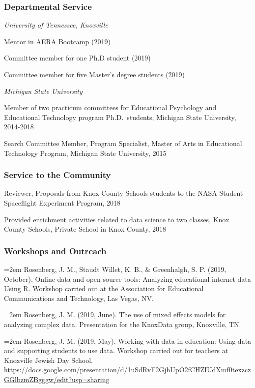 \documentclass[14,]{article}
\begin{document}
\hypertarget{departmental-service}{%
\subsubsection{Departmental Service}\label{departmental-service}}

\emph{University of Tennessee, Knoxville}

Mentor in AERA Bootcamp (2019)

Committee member for one Ph.D student (2019)

Committee member for five Master's degree students (2019)

\emph{Michigan State University}

Member of two practicum committees for Educational Psychology and
Educational Technology program Ph.D.~students, Michigan State
University, 2014-2018

Search Committee Member, Program Specialist, Master of Arts in
Educational Technology Program, Michigan State University, 2015

\hypertarget{service-to-the-community-1}{%
\subsubsection{Service to the
Community}\label{service-to-the-community-1}}

Reviewer, Proposals from Knox County Schools students to the NASA
Student Spaceflight Experiment Program, 2018

Provided enrichment activities related to data science to two classes,
Knox County Schools, Private School in Knox County, 2018

\hypertarget{workshops-and-outreach}{%
\subsubsection{Workshops and Outreach}\label{workshops-and-outreach}}

\hangindent=2em Rosenberg, J. M., Staudt Willet, K. B., \& Greenhalgh,
S. P. (2019, October). Online data and open source tools: Analyzing
educational internet data Using R. Workshop carried out at the
Association for Educational Communications and Technology, Las Vegas,
NV.

\hangindent=2em Rosenberg, J. M. (2019, June). The use of mixed effects
models for analyzing complex data. Presentation for the KnoxData group,
Knoxville, TN.

\hangindent=2em Rosenberg, J. M. (2019, May). Working with data in
education: Using data and supporting students to use data. Workshop
carried out for teachers at Knoxville Jewish Day School.
\url{https://docs.google.com/presentation/d/1uSdRvF2GjhUpO2fCHZIUdXmf0texzczGGlbzmZBgggw/edit?usp=sharing}
\end{document}
